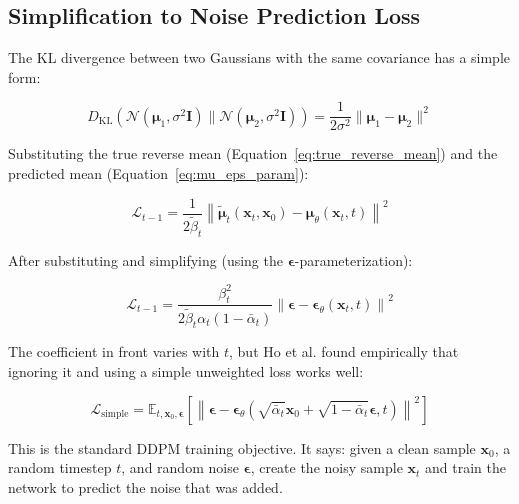 \subsection{Simplification to Noise Prediction Loss}
\label{subsec:simple_loss}

The KL divergence between two Gaussians with the same covariance has a simple form:

\begin{equation}
D_{\text{KL}}\left(\mathcal{N}(\boldsymbol{\mu}_1, \sigma^2\mathbf{I}) \| \mathcal{N}(\boldsymbol{\mu}_2, \sigma^2\mathbf{I})\right) = \frac{1}{2\sigma^2}\|\boldsymbol{\mu}_1 - \boldsymbol{\mu}_2\|^2
\label{eq:kl_gaussians}
\end{equation}

Substituting the true reverse mean (Equation~\ref{eq:true_reverse_mean}) and the predicted mean (Equation~\ref{eq:mu_eps_param}):

\begin{equation}
\mathcal{L}_{t-1} = \frac{1}{2\tilde{\beta}_t}\left\|\tilde{\boldsymbol{\mu}}_t(\mathbf{x}_t, \mathbf{x}_0) - \boldsymbol{\mu}_\theta(\mathbf{x}_t, t)\right\|^2
\label{eq:L_t_expanded}
\end{equation}

After substituting and simplifying (using the $\boldsymbol{\epsilon}$-parameterization):

\begin{equation}
\mathcal{L}_{t-1} = \frac{\beta_t^2}{2\tilde{\beta}_t \alpha_t (1-\bar{\alpha}_t)}\left\|\boldsymbol{\epsilon} - \boldsymbol{\epsilon}_\theta(\mathbf{x}_t, t)\right\|^2
\label{eq:L_t_eps}
\end{equation}

The coefficient in front varies with $t$, but Ho et al. found empirically that ignoring it and using a simple unweighted loss works well:

\begin{equation}
\boxed{\mathcal{L}_{\text{simple}} = \mathbb{E}_{t, \mathbf{x}_0, \boldsymbol{\epsilon}}\left[\left\|\boldsymbol{\epsilon} - \boldsymbol{\epsilon}_\theta\left(\sqrt{\bar{\alpha}_t}\mathbf{x}_0 + \sqrt{1-\bar{\alpha}_t}\boldsymbol{\epsilon}, t\right)\right\|^2\right]}
\label{eq:simple_loss}
\end{equation}

This is the standard DDPM training objective. It says: given a clean sample $\mathbf{x}_0$, a random timestep $t$, and random noise $\boldsymbol{\epsilon}$, create the noisy sample $\mathbf{x}_t$ and train the network to predict the noise that was added.

